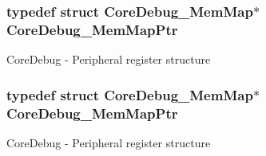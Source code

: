 \subsubsection[{\texorpdfstring{Core\+Debug\+\_\+\+Mem\+Map\+Ptr}{CoreDebug_MemMapPtr}}]{\setlength{\rightskip}{0pt plus 5cm}typedef struct {\bf Core\+Debug\+\_\+\+Mem\+Map}$\ast$ {\bf Core\+Debug\+\_\+\+Mem\+Map\+Ptr}}\hypertarget{group___core_debug___peripheral_gaa548220bc91b12bd49065fe752579fcd}{}\label{group___core_debug___peripheral_gaa548220bc91b12bd49065fe752579fcd}
Core\+Debug -\/ Peripheral register structure 
\subsubsection[{\texorpdfstring{Core\+Debug\+\_\+\+Mem\+Map\+Ptr}{CoreDebug_MemMapPtr}}]{\setlength{\rightskip}{0pt plus 5cm}typedef struct {\bf Core\+Debug\+\_\+\+Mem\+Map}$\ast$ {\bf Core\+Debug\+\_\+\+Mem\+Map\+Ptr}}\hypertarget{group___core_debug___peripheral_gaa548220bc91b12bd49065fe752579fcd}{}\label{group___core_debug___peripheral_gaa548220bc91b12bd49065fe752579fcd}
Core\+Debug -\/ Peripheral register structure 